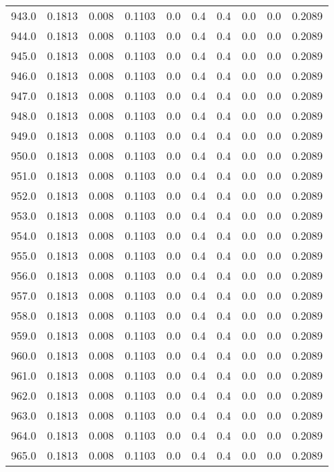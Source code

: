 \begin{longtable}{lrrrrrrrrr}
943.0 & 0.1813 & 0.008 & 0.1103 & 0.0 & 0.4 & 0.4 & 0.0 & 0.0 & 0.2089 \\
944.0 & 0.1813 & 0.008 & 0.1103 & 0.0 & 0.4 & 0.4 & 0.0 & 0.0 & 0.2089 \\
945.0 & 0.1813 & 0.008 & 0.1103 & 0.0 & 0.4 & 0.4 & 0.0 & 0.0 & 0.2089 \\
946.0 & 0.1813 & 0.008 & 0.1103 & 0.0 & 0.4 & 0.4 & 0.0 & 0.0 & 0.2089 \\
947.0 & 0.1813 & 0.008 & 0.1103 & 0.0 & 0.4 & 0.4 & 0.0 & 0.0 & 0.2089 \\
948.0 & 0.1813 & 0.008 & 0.1103 & 0.0 & 0.4 & 0.4 & 0.0 & 0.0 & 0.2089 \\
949.0 & 0.1813 & 0.008 & 0.1103 & 0.0 & 0.4 & 0.4 & 0.0 & 0.0 & 0.2089 \\
950.0 & 0.1813 & 0.008 & 0.1103 & 0.0 & 0.4 & 0.4 & 0.0 & 0.0 & 0.2089 \\
951.0 & 0.1813 & 0.008 & 0.1103 & 0.0 & 0.4 & 0.4 & 0.0 & 0.0 & 0.2089 \\
952.0 & 0.1813 & 0.008 & 0.1103 & 0.0 & 0.4 & 0.4 & 0.0 & 0.0 & 0.2089 \\
953.0 & 0.1813 & 0.008 & 0.1103 & 0.0 & 0.4 & 0.4 & 0.0 & 0.0 & 0.2089 \\
954.0 & 0.1813 & 0.008 & 0.1103 & 0.0 & 0.4 & 0.4 & 0.0 & 0.0 & 0.2089 \\
955.0 & 0.1813 & 0.008 & 0.1103 & 0.0 & 0.4 & 0.4 & 0.0 & 0.0 & 0.2089 \\
956.0 & 0.1813 & 0.008 & 0.1103 & 0.0 & 0.4 & 0.4 & 0.0 & 0.0 & 0.2089 \\
957.0 & 0.1813 & 0.008 & 0.1103 & 0.0 & 0.4 & 0.4 & 0.0 & 0.0 & 0.2089 \\
958.0 & 0.1813 & 0.008 & 0.1103 & 0.0 & 0.4 & 0.4 & 0.0 & 0.0 & 0.2089 \\
959.0 & 0.1813 & 0.008 & 0.1103 & 0.0 & 0.4 & 0.4 & 0.0 & 0.0 & 0.2089 \\
960.0 & 0.1813 & 0.008 & 0.1103 & 0.0 & 0.4 & 0.4 & 0.0 & 0.0 & 0.2089 \\
961.0 & 0.1813 & 0.008 & 0.1103 & 0.0 & 0.4 & 0.4 & 0.0 & 0.0 & 0.2089 \\
962.0 & 0.1813 & 0.008 & 0.1103 & 0.0 & 0.4 & 0.4 & 0.0 & 0.0 & 0.2089 \\
963.0 & 0.1813 & 0.008 & 0.1103 & 0.0 & 0.4 & 0.4 & 0.0 & 0.0 & 0.2089 \\
964.0 & 0.1813 & 0.008 & 0.1103 & 0.0 & 0.4 & 0.4 & 0.0 & 0.0 & 0.2089 \\
965.0 & 0.1813 & 0.008 & 0.1103 & 0.0 & 0.4 & 0.4 & 0.0 & 0.0 & 0.2089 \\

\end{longtable}
